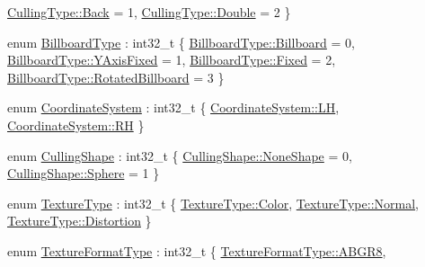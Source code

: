 \begin{DoxyCompactItemize}
\mbox{\hyperlink{namespace_effekseer_a3ae9542a9c9309ec191be1ae5e6dc00aa0557fa923dcee4d0f86b1409f5c2167f}{Culling\+Type\+::\+Back}} = 1, 
\mbox{\hyperlink{namespace_effekseer_a3ae9542a9c9309ec191be1ae5e6dc00aad909d38d705ce75386dd86e611a82f5b}{Culling\+Type\+::\+Double}} = 2
 \}
\item 
enum \mbox{\hyperlink{namespace_effekseer_a1e51959dc188f6f19acc48c85860c6d8}{Billboard\+Type}} \+: int32\+\_\+t \{ \mbox{\hyperlink{namespace_effekseer_a1e51959dc188f6f19acc48c85860c6d8acf9f62d4906d63087d71916c1c94c058}{Billboard\+Type\+::\+Billboard}} = 0, 
\mbox{\hyperlink{namespace_effekseer_a1e51959dc188f6f19acc48c85860c6d8a8d1827d8fca7d2d9db612616da97258a}{Billboard\+Type\+::\+Y\+Axis\+Fixed}} = 1, 
\mbox{\hyperlink{namespace_effekseer_a1e51959dc188f6f19acc48c85860c6d8a4457d440870ad6d42bab9082d9bf9b61}{Billboard\+Type\+::\+Fixed}} = 2, 
\mbox{\hyperlink{namespace_effekseer_a1e51959dc188f6f19acc48c85860c6d8a6bea508c98105aa330e11c3a0b258f23}{Billboard\+Type\+::\+Rotated\+Billboard}} = 3
 \}
\item 
enum \mbox{\hyperlink{namespace_effekseer_ac8508f8823c5fcf36aac5d2ddee23765}{Coordinate\+System}} \+: int32\+\_\+t \{ \mbox{\hyperlink{namespace_effekseer_ac8508f8823c5fcf36aac5d2ddee23765a2b9645dc7a42b738ac9fa5a75117b1c0}{Coordinate\+System\+::\+LH}}, 
\mbox{\hyperlink{namespace_effekseer_ac8508f8823c5fcf36aac5d2ddee23765a9508a19d7801e07ee7b7628c31bfdd47}{Coordinate\+System\+::\+RH}}
 \}
\item 
enum \mbox{\hyperlink{namespace_effekseer_a6c32bc0e986ad6c6ed7e2aca639d4132}{Culling\+Shape}} \+: int32\+\_\+t \{ \mbox{\hyperlink{namespace_effekseer_a6c32bc0e986ad6c6ed7e2aca639d4132af9522e8a7d1cc4f338498025afb612bf}{Culling\+Shape\+::\+None\+Shape}} = 0, 
\mbox{\hyperlink{namespace_effekseer_a6c32bc0e986ad6c6ed7e2aca639d4132ab7095f057db3fefa7325ad93a04e14fd}{Culling\+Shape\+::\+Sphere}} = 1
 \}
\item 
enum \mbox{\hyperlink{namespace_effekseer_a781925ba462884c4ef87fd38ffdedba4}{Texture\+Type}} \+: int32\+\_\+t \{ \mbox{\hyperlink{namespace_effekseer_a781925ba462884c4ef87fd38ffdedba4acb5feb1b7314637725a2e73bdc9f7295}{Texture\+Type\+::\+Color}}, 
\mbox{\hyperlink{namespace_effekseer_a781925ba462884c4ef87fd38ffdedba4a960b44c579bc2f6818d2daaf9e4c16f0}{Texture\+Type\+::\+Normal}}, 
\mbox{\hyperlink{namespace_effekseer_a781925ba462884c4ef87fd38ffdedba4ad3682f9ce9248e18f2d1cecf9f8fa049}{Texture\+Type\+::\+Distortion}}
 \}
\item 
enum \mbox{\hyperlink{namespace_effekseer_ad44c2314bf2d674ae0e6d62db6ff4484}{Texture\+Format\+Type}} \+: int32\+\_\+t \{ \mbox{\hyperlink{namespace_effekseer_ad44c2314bf2d674ae0e6d62db6ff4484a241839feb78cf37a50e99a39bb64dab3}{Texture\+Format\+Type\+::\+A\+B\+G\+R8}}, 

\end{DoxyCompactItemize}
